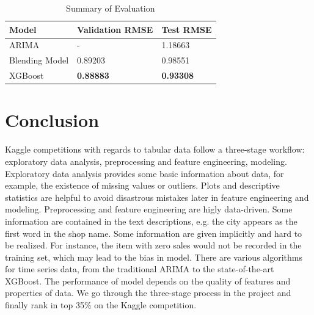 \documentclass{article}
\begin{document}
\begin{table}[!ht]
    \centering
    \caption{Summary of Evaluation}
    \label{tab:evaluation}
    \begin{tabular}{lll}
        \toprule
        \textbf{Model} & \textbf{Validation RMSE} & \textbf{Test RMSE}\\
        \midrule
        ARIMA & - & 1.18663\\
        Blending Model & 0.89203 & 0.98551\\
        XGBoost & \textbf{0.88883} & \textbf{0.93308}\\
        \bottomrule
    \end{tabular}
\end{table}

\section{Conclusion}
Kaggle competitions with regards to tabular data follow a three-stage workflow: exploratory data analysis, preprocessing and feature engineering, modeling. Exploratory data analysis provides some basic information about data, for example, the existence of missing values or outliers. Plots and descriptive statistics are helpful to avoid disastrous mistakes later in feature engineering and modeling. Preprocessing and feature engineering are higly data-driven. Some information are contained in the text descriptions, e.g. the city appears as the first word in the shop name. Some information are given implicitly and hard to be realized. For instance, the item with zero sales would not be recorded in the training set, which may lead to the bias in model. There are various algorithms for time series data, from the traditional ARIMA to the state-of-the-art XGBoost. The performance of model depends on the quality of features and properties of data. We go through the three-stage process in the project and finally rank in top 35\% on the Kaggle competition.
\end{document}
